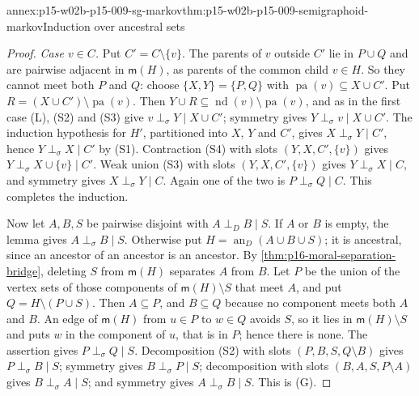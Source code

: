\begin{annexitem}{annex:p15-w02b-p15-009-sg-markov}{thm:p15-w02b-p15-009-semigraphoid-markov}{Induction over ancestral sets}
\begin{proof}
\emph{Case \(v\in C\).} Put \(C'=C\setminus\{v\}\). The parents of
\(v\) outside \(C'\) lie in \(P\cup Q\) and are pairwise adjacent in
\(\mathsf m(H)\), as parents of the common child \(v\in H\). So they
cannot meet both \(P\) and \(Q\): choose \(\{X,Y\}=\{P,Q\}\) with
\(\operatorname{pa}(v)\subseteq X\cup C'\). Put
\(R=(X\cup C')\setminus\operatorname{pa}(v)\). Then
\(Y\cup R\subseteq\operatorname{nd}(v)\setminus\operatorname{pa}(v)\),
and as in the first case (L), (S2) and (S3) give
\(v\perp_\sigma Y\mid X\cup C'\); symmetry gives
\(Y\perp_\sigma v\mid X\cup C'\). The induction hypothesis for \(H'\),
partitioned into \(X\), \(Y\) and \(C'\), gives
\(X\perp_\sigma Y\mid C'\), hence \(Y\perp_\sigma X\mid C'\) by (S1).
Contraction (S4) with slots \((Y,X,C',\{v\})\) gives
\(Y\perp_\sigma X\cup\{v\}\mid C'\). Weak union (S3) with slots
\((Y,X,C',\{v\})\) gives \(Y\perp_\sigma X\mid C\), and symmetry gives
\(X\perp_\sigma Y\mid C\). Again one of the two is
\(P\perp_\sigma Q\mid C\). This completes the induction.

Now let \(A,B,S\) be pairwise disjoint with \(A\mathrel{\perp_D}B\mid S\).
If \(A\) or \(B\) is empty, the lemma gives \(A\perp_\sigma B\mid S\).
Otherwise put \(H=\operatorname{an}_D(A\cup B\cup S)\); it is ancestral,
since an ancestor of an ancestor is an ancestor. By
\cref{thm:p16-moral-separation-bridge}, deleting \(S\) from
\(\mathsf m(H)\) separates \(A\) from \(B\). Let \(P\) be the union of
the vertex sets of those components of \(\mathsf m(H)\setminus S\) that
meet \(A\), and put \(Q=H\setminus(P\cup S)\). Then \(A\subseteq P\),
and \(B\subseteq Q\) because no component meets both \(A\) and \(B\).
An edge of \(\mathsf m(H)\) from \(u\in P\) to \(w\in Q\) avoids \(S\),
so it lies in \(\mathsf m(H)\setminus S\) and puts \(w\) in the
component of \(u\), that is in \(P\); hence there is none. The
assertion gives \(P\perp_\sigma Q\mid S\). Decomposition (S2) with
slots \((P,B,S,Q\setminus B)\) gives \(P\perp_\sigma B\mid S\); symmetry
gives \(B\perp_\sigma P\mid S\); decomposition with slots
\((B,A,S,P\setminus A)\) gives \(B\perp_\sigma A\mid S\); and symmetry
gives \(A\perp_\sigma B\mid S\). This is (G).


\end{proof}
\end{annexitem}
